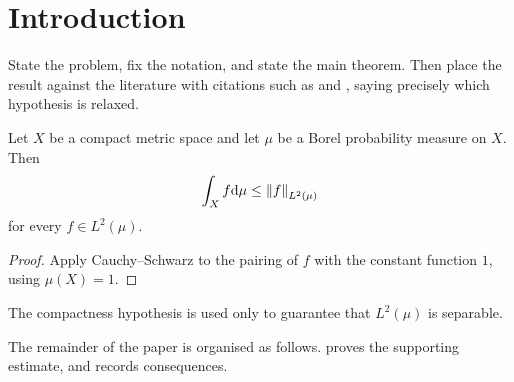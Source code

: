 
\section{Introduction}
\label{sec:introduction}

State the problem, fix the notation, and state the main theorem.
Then place the result against the literature with citations such as
\cite{example-classical} and \cite{example-modern}, saying precisely
which hypothesis is relaxed.

\begin{theorem}
\label{thm:main}
Let $X$ be a compact metric space and let $\mu$ be a Borel probability
measure on $X$. Then
\begin{equation}
\label{eq:main}
  \int_X f \mathrm{d}\mu \le \left\lVert f \right\rVert_{L^2(\mu)}
\end{equation}
for every $f \in L^2(\mu)$.
\end{theorem}

\begin{proof}
Apply Cauchy--Schwarz to the pairing of $f$ with the constant function
$1$, using $\mu(X) = 1$.
\end{proof}

\begin{remark}
\label{rem:scope}
The compactness hypothesis is used only to guarantee that
$L^2(\mu)$ is separable.
\end{remark}

The remainder of the paper is organised as follows.
 proves the supporting estimate, and
 records consequences.

